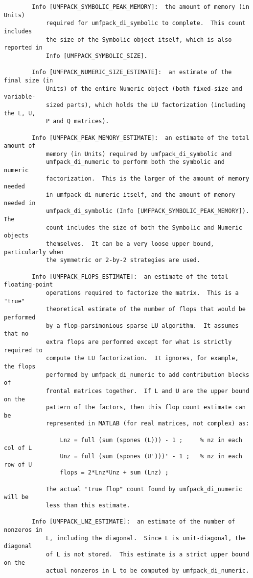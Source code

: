 \documentclass[11pt]{article}
\begin{document}
{\begin{verbatim}
        Info [UMFPACK_SYMBOLIC_PEAK_MEMORY]:  the amount of memory (in Units)
            required for umfpack_di_symbolic to complete.  This count includes
            the size of the Symbolic object itself, which is also reported in
            Info [UMFPACK_SYMBOLIC_SIZE].

        Info [UMFPACK_NUMERIC_SIZE_ESTIMATE]:  an estimate of the final size (in
            Units) of the entire Numeric object (both fixed-size and variable-
            sized parts), which holds the LU factorization (including the L, U,
            P and Q matrices).

        Info [UMFPACK_PEAK_MEMORY_ESTIMATE]:  an estimate of the total amount of
            memory (in Units) required by umfpack_di_symbolic and
            umfpack_di_numeric to perform both the symbolic and numeric
            factorization.  This is the larger of the amount of memory needed
            in umfpack_di_numeric itself, and the amount of memory needed in
            umfpack_di_symbolic (Info [UMFPACK_SYMBOLIC_PEAK_MEMORY]).  The
            count includes the size of both the Symbolic and Numeric objects
            themselves.  It can be a very loose upper bound, particularly when
            the symmetric or 2-by-2 strategies are used.

        Info [UMFPACK_FLOPS_ESTIMATE]:  an estimate of the total floating-point
            operations required to factorize the matrix.  This is a "true"
            theoretical estimate of the number of flops that would be performed
            by a flop-parsimonious sparse LU algorithm.  It assumes that no
            extra flops are performed except for what is strictly required to
            compute the LU factorization.  It ignores, for example, the flops
            performed by umfpack_di_numeric to add contribution blocks of
            frontal matrices together.  If L and U are the upper bound on the
            pattern of the factors, then this flop count estimate can be
            represented in MATLAB (for real matrices, not complex) as:

                Lnz = full (sum (spones (L))) - 1 ;     % nz in each col of L
                Unz = full (sum (spones (U')))' - 1 ;   % nz in each row of U
                flops = 2*Lnz*Unz + sum (Lnz) ;

            The actual "true flop" count found by umfpack_di_numeric will be
            less than this estimate.

        Info [UMFPACK_LNZ_ESTIMATE]:  an estimate of the number of nonzeros in
            L, including the diagonal.  Since L is unit-diagonal, the diagonal
            of L is not stored.  This estimate is a strict upper bound on the
            actual nonzeros in L to be computed by umfpack_di_numeric.


\end{verbatim}}
\end{document}
